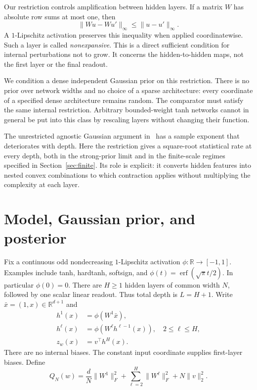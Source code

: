 \documentclass[11pt]{article}
\theoremstyle{definition}\newtheorem{definition}[theorem]{Definition}
\theoremstyle{remark}\newtheorem{remark}[theorem]{Remark}
\newcommand{\R}{\mathbb R}\newcommand{\E}{\mathbb E}
\begin{document}
Our restriction controls amplification between hidden layers. If a matrix $W$ has absolute row sums at most one, then
\[
 \|Wu-Wu'\|_\infty\leq\|u-u'\|_\infty.
\]
A $1$-Lipschitz activation preserves this inequality when applied coordinatewise. Such a layer is called \emph{nonexpansive}. This is a direct sufficient condition for internal perturbations not to grow. It concerns the hidden-to-hidden maps, not the first layer or the final readout.

We condition a dense independent Gaussian prior on this restriction. There is no prior over network widths and no choice of a sparse architecture: every coordinate of a specified dense architecture remains random. The comparator must satisfy the same internal restriction. Arbitrary bounded-weight tanh networks cannot in general be put into this class by rescaling layers without changing their function.

The unrestricted agnostic Gaussian argument in~\cite{sharper,opus} has a sample exponent that deteriorates with depth. Here the restriction gives a square-root statistical rate at every depth, both in the strong-prior limit and in the finite-scale regimes specified in Section~\ref{sec:finite}. Its role is explicit: it converts hidden features into nested convex combinations to which contraction applies without multiplying the complexity at each layer.

\section{Model, Gaussian prior, and posterior}

Fix a continuous odd nondecreasing $1$-Lipschitz activation $\phi:\R\to[-1,1]$. Examples include tanh, hardtanh, softsign, and $\phi(t)=\operatorname{erf}(\sqrt\pi t/2)$. In particular $\phi(0)=0$. There are $H\geq1$ hidden layers of common width $N$, followed by one scalar linear readout. Thus total depth is $L=H+1$. Write $\bar x=(1,x)\in\R^{d+1}$ and
\begin{align*}
 h^1(x)&=\phi(W^1\bar x),\\
 h^\ell(x)&=\phi(W^\ell h^{\ell-1}(x)),\quad 2\leq\ell\leq H,\\
 z_w(x)&=v^\top h^H(x).
\end{align*}
There are no internal biases. The constant input coordinate supplies first-layer biases. Define
\begin{equation}
 Q_N(w)=\frac dN\|W^1\|_F^2+
       \sum_{\ell=2}^H\|W^\ell\|_F^2+N\|v\|_2^2.
 \label{eq:energy}
\end{equation}
\end{document}

